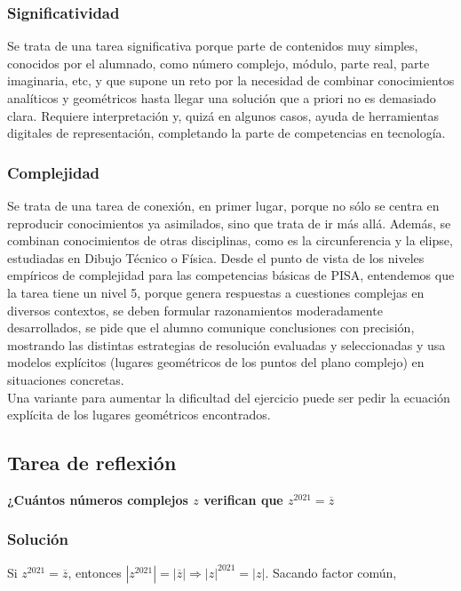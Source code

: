 \documentclass[../main.tex]{memoir}
\begin{document}
\subsubsection{Significatividad}
Se trata de una tarea significativa porque parte de contenidos muy simples, conocidos por el alumnado, como número complejo, módulo, parte real, parte imaginaria, etc, y que supone un reto por la necesidad de combinar conocimientos analíticos y geométricos hasta llegar una solución que a priori no es demasiado clara. Requiere interpretación y, quizá en algunos casos, ayuda de herramientas digitales de representación, completando la parte de competencias en tecnología.

\subsubsection{Complejidad}
Se trata de una tarea de conexión, en primer lugar, porque no sólo se centra en reproducir conocimientos ya asimilados, sino que trata de ir más allá. Además, se combinan conocimientos de otras disciplinas, como es la circunferencia y la elipse, estudiadas en Dibujo Técnico o Física. Desde el punto de vista de los niveles empíricos de complejidad para las competencias básicas de PISA, entendemos que la tarea tiene un nivel 5, porque genera respuestas a cuestiones complejas en diversos contextos, se deben formular razonamientos moderadamente desarrollados, se pide que el alumno comunique conclusiones con precisión, mostrando las distintas estrategias de resolución evaluadas y seleccionadas y usa modelos explícitos (lugares geométricos de los puntos del plano complejo) en situaciones concretas. \\

Una variante para aumentar la dificultad del ejercicio puede ser pedir la ecuación explícita de los lugares geométricos encontrados.


\subsection{Tarea de reflexión}

\textbf{¿Cuántos números complejos $z$ verifican que $z^{2021} = \overline{z}$}

\subsubsection{Solución}

Si $z^{2021}= \overline{z}$, entonces $|z^{2021}|= |\overline{z}| \Rightarrow |z|^{2021} = |z|$. Sacando factor común, 
\end{document}
